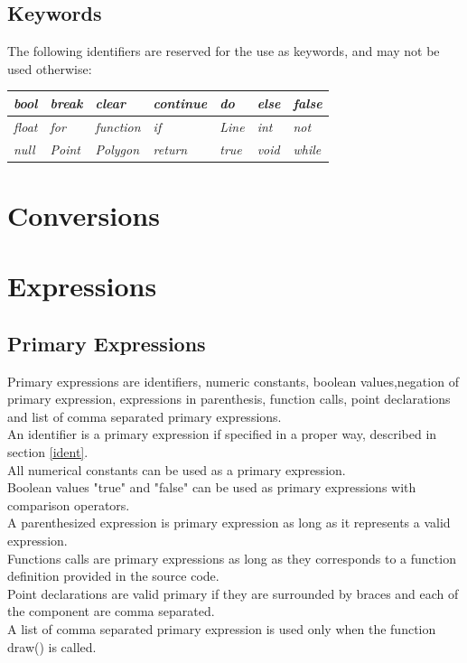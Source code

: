 \documentclass{l3proj}
\begin{document}
\subsection{Keywords}
The following identifiers are reserved for the use as keywords, and may not be used otherwise: 


\begin{center}
    \begin{tabular}{ | l | l | l | l | l |l|l|}
    \hline
    \textit{bool} & \textit{break} & \textit{clear} & \textit{continue}& \textit{do}  &  \textit{else} & \textit{false}\\
    \hline \textit{float} & \textit{for}& \textit{function} &
 
    \textit{if} & \textit{Line} & \textit{int} & \textit{not}\\ 
    \hline
    
    \textit{null} &
    \textit{Point} & \textit{Polygon} & \textit{return} & \textit{true}
     &
    \textit{void} & \textit{while} \\
    \hline

    \end{tabular}
\end{center}

\section{Conversions}
\section{Expressions}
\subsection{Primary Expressions}
Primary expressions are identifiers, numeric constants, boolean values,negation of primary expression, expressions in parenthesis, function calls, point declarations  and list of comma separated primary expressions.\\
An identifier is a primary expression if specified in a proper way, described in section \ref{ident}.\\ All numerical constants can be used as a primary expression.\\ Boolean values "true" and "false" can be used as primary expressions with comparison operators.\\ A parenthesized expression is primary expression as long as it represents a valid expression.\\ Functions calls are primary expressions as long as they corresponds to a function definition provided in the source code. \\Point declarations are valid primary  if they are surrounded by braces and each of the component are comma separated.\\ A list of comma separated primary expression is used only when the function draw() is called.  
\end{document}
